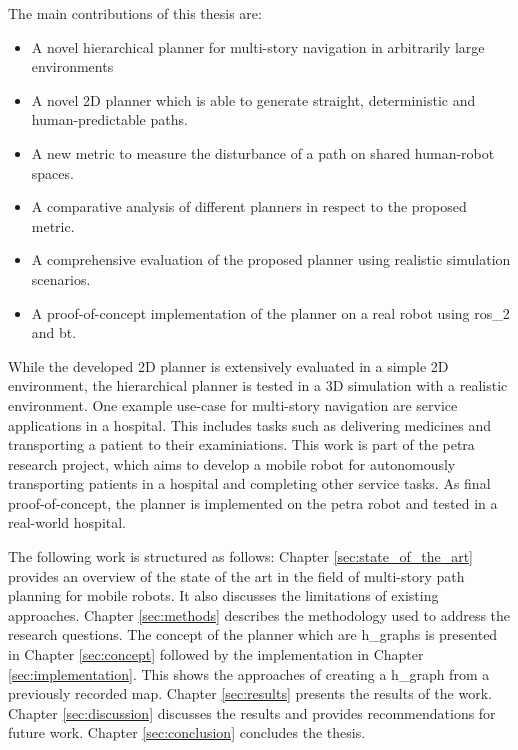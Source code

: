 The main contributions of this thesis are:
\begin{itemize}
    \item A novel hierarchical planner for multi-story navigation in arbitrarily large environments
    \item A novel 2D planner which is able to generate straight, deterministic and human-predictable paths.
    \item A new metric to measure the disturbance of a path on shared human-robot spaces.
    \item A comparative analysis of different planners in respect to the proposed metric.
    \item A comprehensive evaluation of the proposed planner using realistic simulation scenarios.
    \item A proof-of-concept implementation of the planner on a real robot using \gls{ros_2} and \gls{bt}.
\end{itemize}

While the developed 2D planner is extensively evaluated in a simple 2D environment, the hierarchical planner is tested in a 3D simulation with a realistic environment. One example use-case for multi-story navigation are service applications in a hospital. This includes tasks such as delivering medicines and transporting a patient to their examiniations. This work is part of the \gls{petra} research project, which aims to develop a mobile robot for autonomously transporting patients in a hospital and completing other service tasks. As final proof-of-concept, the planner is implemented on the \gls{petra} robot and tested in a real-world hospital.

The following work is structured as follows: Chapter \ref{sec:state_of_the_art} provides an overview of the state of the art in the field of multi-story path planning for mobile robots. It also discusses the limitations of existing approaches. Chapter \ref{sec:methods} describes the methodology used to address the research questions. The concept of the planner which are \glspl{h_graph} is presented in Chapter \ref{sec:concept} followed by the implementation in Chapter \ref{sec:implementation}. This shows the approaches of creating a \gls{h_graph} from a previously recorded map. Chapter \ref{sec:results} presents the results of the work. Chapter \ref{sec:discussion} discusses the results and provides recommendations for future work. Chapter \ref{sec:conclusion} concludes the thesis.